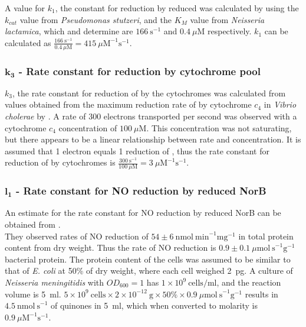 A value for $k_1$, the constant for \cOxygen{} reduction by reduced \cbbthree{} was calculated by using the $k_{cat}$ value from \textit{Pseudomonas stutzeri}, and the $K_M$ value from \textit{Neisseria lactamica}, which \citet{Forte2001} and \citet{Hunter2007} determine are $166~\mathrm{s}^{-1}$ and $0.4~\mu \mathrm{M}$ respectively. $k_1$ can be calculated as $\frac{166~\mathrm{s}^{-1}}{0.4~\mu \mathrm{M}} = 415~\mu \mathrm{M}^{-1}\mathrm{s}^{-1}$.

\subsubsection*{$\mathbf{k_3}$ {\bf- Rate constant for \cbbthree{} reduction by cytochrome pool}}
$k_3$, the rate constant for reduction of \cbbthree{} by the cytochromes was calculated from values obtained from the maximum reduction rate of \cbbthree{} by cytochrome $c_4$ in \textit{Vibrio cholerae} by \citet{Chang2010}. A rate of 300 electrons transported per second was observed with a cytochrome $c_4$ concentration of $100~\mu \mathrm{M}$. This concentration was not saturating, but there appears to be a linear relationship between rate and concentration. It is assumed that 1 electron equals 1 reduction of \cbbthree{}, thus the rate constant for reduction of \cbbthree{} by cytochromes is $\frac{300~\mathrm{s}^{-1}}{100~\mu \mathrm{M}} = 3~\mu \mathrm{M}^{-1}\mathrm{s}^{-1}$.

\subsubsection*{$\mathbf{l_1}$ {\bf- Rate constant for NO reduction by reduced NorB}}

An estimate for the rate constant for NO reduction by reduced NorB can be obtained from \citet{Rock2007}.\\
\noindent They observed rates of NO reduction of $54 \pm 6~\mathrm{nmol~min}^{-1} \mathrm{mg}^{-1}$  in total protein content from dry weight. Thus the rate of NO reduction is $0.9 \pm 0.1~\mu\mathrm{mol~s}^{-1}\mathrm{g}^{-1}$ bacterial protein. The protein content of the cells was assumed to be similar to that of \textit{E. coli} at 50\% of dry weight, where each cell weighed 2~pg. A culture of \textit{Neisseria meningitidis} with $OD_{600} = 1$ has $1 \times 10^9~\textrm{cells/ml}$, and the reaction volume is 5~ml. $5\times 10^9~\textrm{cells} \times 2\times 10^{-12}~\textrm{g} \times 50\% \times 0.9~\mu\mathrm{mol~ s}^{-1}\mathrm{g}^{-1}$ results in $4.5~\mathrm{nmol~s}^{-1}$ of quinones in 5~ml, which when converted to molarity is $0.9~\mu \mathrm{M}^{-1} \mathrm{s}^{-1}$.

